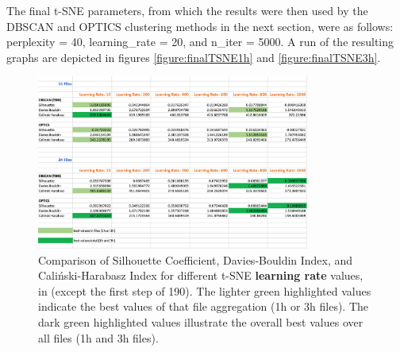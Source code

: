 The final t-SNE parameters, from which the results were then used by the DBSCAN and OPTICS clustering methods in the next section, were as follows: perplexity = 40, learning\_rate = 20, and n\_iter = 5000. A run of the resulting graphs are depicted in figures \ref{figure:finalTSNE1h} and \ref{figure:finalTSNE3h}.


\begin{figure}
  \centering
  \includegraphics[width=0.8\textwidth]{./images/tsneParametersTest/learningRate/learningRateEvaluationScores.png}
  \caption{Comparison of Silhouette Coefficient, Davies-Bouldin Index, and Caliński-Harabasz Index for different t-SNE \textbf{learning rate} values, in  (except the first step of 190). The lighter green highlighted values indicate the best values of that file aggregation (1h or 3h files). The dark green highlighted values illustrate the overall best values over all files (1h and 3h files).}
  \label{figure:learningRateEvaluationScores}
\end{figure}



